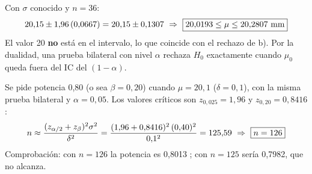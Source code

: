 Con $\sigma$ conocido y $n=36$:
\[
20{,}15\pm1{,}96\,(0{,}0667)=20{,}15\pm0{,}1307\ \Rightarrow\ \res{20{,}0193\le\mu\le20{,}2807\ \text{mm}}
\]
El valor 20 \textbf{no} está en el intervalo, lo que coincide con el rechazo de b). Por la dualidad, una prueba bilateral con nivel $\alpha$ rechaza $H_0$ exactamente cuando $\mu_0$ queda fuera del IC del $(1-\alpha)$.

Se pide potencia 0,80 (o sea $\beta=0{,}20$) cuando $\mu=20{,}1$ ($\delta=0{,}1$), con la misma prueba bilateral y $\alpha=0{,}05$. Los valores críticos son $z_{0,025}=1{,}96$ y $z_{0,20}=0{,}8416$:
\[
n\approx\frac{(z_{\alpha/2}+z_\beta)^2\sigma^2}{\delta^2}=\frac{(1{,}96+0{,}8416)^2\,(0{,}40)^2}{0{,}1^2}=125{,}59\ \Rightarrow\ \res{n=126}
\]
Comprobación: con $n=126$ la potencia es 0,8013 \checkmark; con $n=125$ sería 0,7982, que no alcanza.
